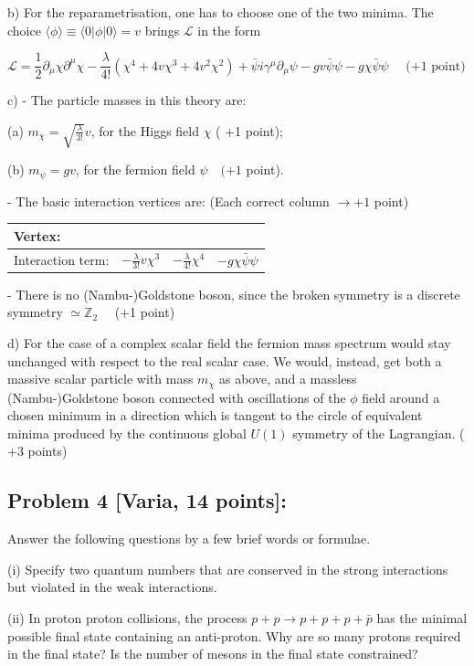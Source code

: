 \documentclass[10pt, letterpaper]{article}
\begin{document}
b) For the reparametrisation, one has to choose one of the two minima. The choice $\langle\phi\rangle \equiv\langle 0| \phi|0\rangle=v$ brings $\mathcal{L}$ in the form

$$
\mathcal{L}=\frac{1}{2} \partial_\mu \chi \partial^\mu \chi-\frac{\lambda}{4!}\left(\chi^4+4 v \chi^3+4 v^2 \chi^2\right)+\bar{\psi} i \gamma^\mu \partial_\mu \psi-g v \bar{\psi} \psi-g \chi \bar{\psi} \psi \quad \text { (+1 point) }
$$

c) - The particle masses in this theory are:

(a) $m_\chi=\sqrt{\frac{\lambda}{3!}} v$, for the Higgs field $\chi$ ( +1 point);

(b) $m_\psi=g v$, for the fermion field $\psi \quad(+1$ point).

- The basic interaction vertices are: (Each correct column $\rightarrow+1$ point)

\begin{tabular}{|l|l|l|l|}
\hline Vertex: & & & \\
\hline Interaction term: & $-\frac{\lambda}{3!} v \chi^3$ & $-\frac{\lambda}{4!} \chi^4$ & $-g \chi \bar{\psi} \psi$ \\
\hline
\end{tabular}

- There is no (Nambu-)Goldstone boson, since the broken symmetry is a discrete symmetry $\simeq \mathbb{Z}_2 \quad$ (+1 point)


d) For the case of a complex scalar field the fermion mass spectrum would stay unchanged with respect to the real scalar case. We would, instead, get both a massive scalar particle with mass $m_\chi$ as above, and a massless (Nambu-)Goldstone boson connected with oscillations of the $\phi$ field around a chosen minimum in a direction which is tangent to the circle of equivalent minima produced by the continuous global $U(1)$ symmetry of the Lagrangian. ( +3 points)



\subsection{Problem 4 [Varia, 14 points]:}

Answer the following questions by a few brief words or formulae.

(i) Specify two quantum numbers that are conserved in the strong interactions but violated in the weak interactions.

(ii) In proton proton collisions, the process $p+p \rightarrow p+p+p+\bar{p}$ has the minimal possible final state containing an anti-proton. Why are so many protons required in the final state? Is the number of mesons in the final state constrained?
\end{document}
